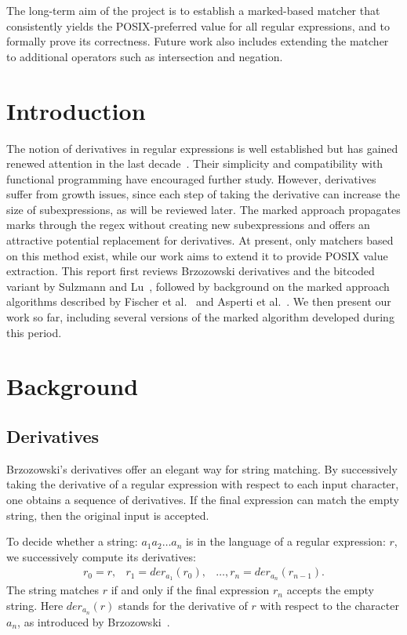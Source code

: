 \documentclass[12pt]{article}
\newcommand{\der}{\textit{der}}
\begin{document}
The long-term aim of the project is to establish a marked-based matcher that consistently yields the POSIX-preferred value for all regular expressions, and to formally prove its correctness.  
Future work also includes extending the matcher to additional operators such as intersection and negation.  

\newpage

\tableofcontents

\newpage

\section{Introduction}

The notion of derivatives in regular expressions is well established but has gained renewed attention in the last decade~\cite{Owens2009, Might2011}.  
Their simplicity and compatibility with functional programming have encouraged further study.  
However, derivatives suffer from growth issues, since each step of taking the derivative can increase the size of subexpressions, as will be reviewed later.  
The marked approach propagates marks through the regex without creating new subexpressions and offers an attractive potential replacement for derivatives.  
At present, only matchers based on this method exist, while our work aims to extend it to provide POSIX value extraction.  
This report first reviews Brzozowski derivatives and the bitcoded variant by Sulzmann and Lu~\cite{Sulzmann2014}, followed by background on the marked approach algorithms described by Fischer et al.~\cite{Fischer2010} and Asperti et al.~\cite{Asperti2010}.  
We then present our work so far, including several versions of the marked algorithm developed during this period.  


\section{Background}
\subsection{Derivatives}

Brzozowski’s derivatives offer an elegant way for string matching. By successively taking the derivative of a regular
expression with respect to each input character, one obtains a sequence of derivatives. If the final expression can match 
the empty string, then the original input is accepted.


To decide whether a string: $a_1 a_2 \dots a_n$ is in the language of a regular expression: $r$, we successively 
compute its derivatives:
\[
\begin{array}{rcl}
r_0 = r,& r_1 = \der_{a_1}(r_0),& \dots, r_n = \der_{a_n}(r_{n-1}) .
\end{array}
\]
The string matches $r$ if and only if the final expression $r_n$ accepts the empty string. Here $\der_{a_n}(r)$ stands 
for the derivative of $r$ with respect to the character $a_n$, as introduced by Brzozowski~\cite{Brzozowski1964}.
\end{document}

